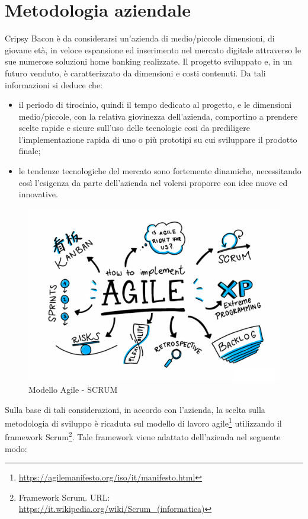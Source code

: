 \section{Metodologia aziendale}
Cripsy Bacon è da considerarsi un'azienda di medio/piccole dimensioni, di giovane età, in veloce espansione ed inserimento nel mercato digitale attraverso le sue numerose soluzioni home banking realizzate. Il progetto sviluppato e, in un futuro venduto, è caratterizzato da dimensioni e costi contenuti. Da tali informazioni si deduce che: 
\begin{itemize}
    \item il periodo di tirocinio, quindi il tempo dedicato al progetto, e le dimensioni medio/piccole, con la relativa giovinezza dell'azienda, comportino a prendere scelte rapide e sicure sull'uso delle tecnologie cosi da prediligere l'implementazione rapida di uno o più prototipi su cui sviluppare il prodotto finale;
    \item le tendenze tecnologiche del mercato sono fortemente dinamiche, necessitando così l'esigenza da parte dell'azienda nel volersi proporre con idee nuove ed innovative.
\end{itemize}
\begin{figure}[H] 
    \centering 
    \includegraphics[width=1\columnwidth]{immagini/scrum.png}
    \caption{\label{fig:agile_scrum}Modello Agile - SCRUM}
\end{figure}
Sulla base di tali considerazioni, in accordo con l'azienda, la scelta sulla metodologia di sviluppo è ricaduta sul modello di lavoro agile\footnote{\href{Modello agile: URL: https://agilemanifesto.org/iso/it/manifesto.html}{https://agilemanifesto.org/iso/it/manifesto.html}} utilizzando il framework Scrum\footnote{Framework Scrum. URL: \href{https://it.wikipedia.org/wiki/Scrum\_(informatica)}{https://it.wikipedia.org/wiki/Scrum\_(informatica)}}. Tale framework viene adattato dell'azienda nel seguente modo:
